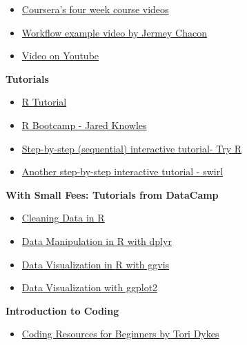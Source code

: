 \documentclass[]{book}
\providecommand{\tightlist}{%
  \setlength{\itemsep}{0pt}\setlength{\parskip}{0pt}}
\theoremstyle{definition}
\theoremstyle{definition}
\theoremstyle{remark}
\begin{document}
\begin{itemize}
\item
  \href{http://blog.revolutionanalytics.com/2012/12/coursera-videos.html}{Coursera's
  four week course videos}
\item
  \href{http://bitesizebio.com/webinar/20600/beginners-introduction-to-r-statistical-software/}{Workflow
  example video by Jermey Chacon}
\item
  \href{https://www.youtube.com/watch?v=cX532N_XLIs\&list=PLqzoL9-eJTNBDdKgJgJzaQcY6OXmsXAHU}{Video
  on Youtube}
\end{itemize}

\textbf{Tutorials}

\begin{itemize}
\item
  \href{https://www.tutorialspoint.com/r/index.htm}{R Tutorial}
\item
  \href{https://www.jaredknowles.com/r-bootcamp/}{R Bootcamp - Jared
  Knowles}
\item
  \href{http://tryr.codeschool.com/}{Step-by-step (sequential)
  interactive tutorial- Try R}
\item
  \href{http://swirlstats.com/students.html}{Another step-by-step
  interactive tutorial - swirl}
\end{itemize}

\textbf{With Small Fees: Tutorials from DataCamp}

\begin{itemize}
\item
  \href{https://www.datacamp.com/courses/cleaning-data-in-r}{Cleaning
  Data in R}
\item
  \href{https://www.datacamp.com/courses/dplyr-data-manipulation-r-tutorial}{Data
  Manipulation in R with dplyr}
\item
  \href{https://www.datacamp.com/courses/ggvis-data-visualization-r-tutorial}{Data
  Visualization in R with ggvis}
\item
  \href{https://www.datacamp.com/courses/data-visualization-with-ggplot2-1}{Data
  Visualization with ggplot2}
\end{itemize}

\textbf{Introduction to Coding}

\begin{itemize}
\tightlist
\item
  \href{http://toridykes.com/blog/2015/10/25/coding-resources-for-beginners\#.WMf84xCNooE}{Coding
  Resources for Beginners by Tori Dykes}
\end{itemize}


\end{document}
